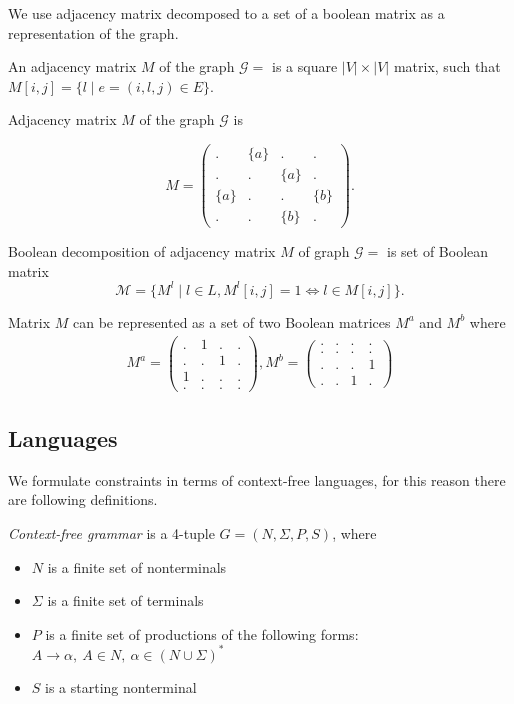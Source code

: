 We use adjacency matrix decomposed to a set of a boolean matrix as a representation of the graph.
\begin{definition}
An adjacency matrix $M$ of the graph $\mathcal{G}=$ is a square $|V|\times|V|$ matrix, such that $M[i,j] = \{l \mid e = (i,l,j) \in E\}$.
\end{definition}

Adjacency matrix $M$ of the graph $\mathcal{G}$ is

$$
    M =
    \begin{pmatrix}
    . & \{a\} & . & .     \\
    . & . & \{a\} & .     \\
    \{a\} & . & . & \{b\} \\
    . & . & \{b\} & .
    \end{pmatrix}.
$$

\begin{definition}

Boolean decomposition of adjacency matrix $M$ of graph $\mathcal{G}=$ is set of Boolean matrix $$\mathcal{M} = \{M^l \mid l \in L, M^l[i,j]=1 \iff l \in M[i,j]\}.$$

\end{definition}

Matrix $M$ can be represented as a set of two Boolean matrices $M^a$ and $M^b$ where
\begin{align}
M^{a} =
\begin{pmatrix}
    . & 1 & . & .   \\
    . & . & 1 & .   \\
    1 & . & . & .   \\
    . & . & . & .  
\end{pmatrix}, 
M^{b} =
\begin{pmatrix}      
    . & . & . & .   \\
    . & . & . & .   \\
    . & . & . & 1   \\
    . & . & 1 & . 
\end{pmatrix} \label{eq:boolean_decomposition_of_graph}
\end{align}
\subsection{Languages}
We formulate constraints in terms of context-free languages, for this reason there are following definitions.
\begin{definition}\emph{Context-free grammar} is a 4-tuple $G=(N, \Sigma, P, S)$, where 
\begin{itemize}
    \item $N$ is a finite set of nonterminals
    \item $\Sigma$ is a finite set of terminals
    \item $P$ is a finite set of productions of the following forms: $A \to \alpha, ~A \in N,~ \alpha \in (N \cup \Sigma)^*$
    \item $S$ is a starting nonterminal
\end{itemize}
\end{definition}


